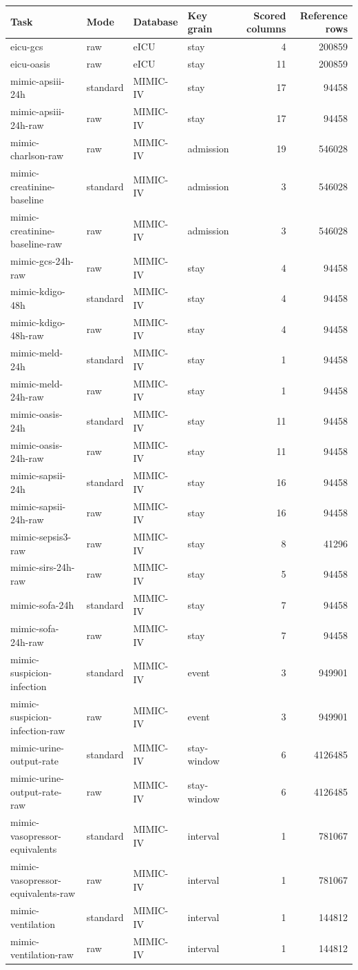 \begin{tabular}{llllrr}
\toprule
Task & Mode & Database & Key grain & Scored columns & Reference rows \\
\midrule
eicu-gcs & raw & eICU & stay & 4 & 200859 \\
eicu-oasis & raw & eICU & stay & 11 & 200859 \\
mimic-apsiii-24h & standard & MIMIC-IV & stay & 17 & 94458 \\
mimic-apsiii-24h-raw & raw & MIMIC-IV & stay & 17 & 94458 \\
mimic-charlson-raw & raw & MIMIC-IV & admission & 19 & 546028 \\
mimic-creatinine-baseline & standard & MIMIC-IV & admission & 3 & 546028 \\
mimic-creatinine-baseline-raw & raw & MIMIC-IV & admission & 3 & 546028 \\
mimic-gcs-24h-raw & raw & MIMIC-IV & stay & 4 & 94458 \\
mimic-kdigo-48h & standard & MIMIC-IV & stay & 4 & 94458 \\
mimic-kdigo-48h-raw & raw & MIMIC-IV & stay & 4 & 94458 \\
mimic-meld-24h & standard & MIMIC-IV & stay & 1 & 94458 \\
mimic-meld-24h-raw & raw & MIMIC-IV & stay & 1 & 94458 \\
mimic-oasis-24h & standard & MIMIC-IV & stay & 11 & 94458 \\
mimic-oasis-24h-raw & raw & MIMIC-IV & stay & 11 & 94458 \\
mimic-sapsii-24h & standard & MIMIC-IV & stay & 16 & 94458 \\
mimic-sapsii-24h-raw & raw & MIMIC-IV & stay & 16 & 94458 \\
mimic-sepsis3-raw & raw & MIMIC-IV & stay & 8 & 41296 \\
mimic-sirs-24h-raw & raw & MIMIC-IV & stay & 5 & 94458 \\
mimic-sofa-24h & standard & MIMIC-IV & stay & 7 & 94458 \\
mimic-sofa-24h-raw & raw & MIMIC-IV & stay & 7 & 94458 \\
mimic-suspicion-infection & standard & MIMIC-IV & event & 3 & 949901 \\
mimic-suspicion-infection-raw & raw & MIMIC-IV & event & 3 & 949901 \\
mimic-urine-output-rate & standard & MIMIC-IV & stay-window & 6 & 4126485 \\
mimic-urine-output-rate-raw & raw & MIMIC-IV & stay-window & 6 & 4126485 \\
mimic-vasopressor-equivalents & standard & MIMIC-IV & interval & 1 & 781067 \\
mimic-vasopressor-equivalents-raw & raw & MIMIC-IV & interval & 1 & 781067 \\
mimic-ventilation & standard & MIMIC-IV & interval & 1 & 144812 \\
mimic-ventilation-raw & raw & MIMIC-IV & interval & 1 & 144812 \\
\bottomrule
\end{tabular}
